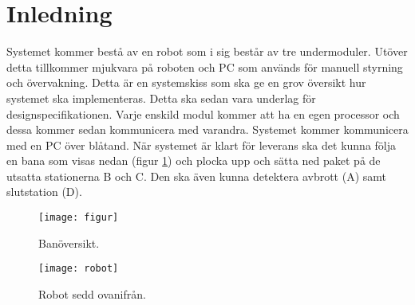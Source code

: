 \section{Inledning}
Systemet kommer bestå av en robot som i sig består av tre undermoduler. Utöver detta tillkommer mjukvara på roboten och PC som används för manuell styrning och övervakning. Detta är en systemskiss som ska ge en grov översikt hur systemet ska implementeras. Detta ska sedan vara underlag för designspecifikationen. 
\newline
\newline
Varje enskild modul kommer att ha en egen processor och dessa kommer sedan kommunicera med varandra. Systemet kommer kommunicera med en PC över blåtand. När systemet är klart för leverans ska det kunna följa en bana som visas nedan (figur \ref{systemskiss:banoversikt}) och plocka upp och sätta ned paket på de utsatta stationerna B och C. Den ska även kunna detektera avbrott (A) samt slutstation (D). 

\begin{figure}[h]
\center
\texttt{[image: figur]}
\caption{Banöversikt.} \label{systemskiss:banoversikt}
\end{figure}

\begin{figure}[h]
\center
\texttt{[image: robot]}
\caption{Robot sedd ovanifrån.} \label{designspec:robot}
\end{figure}

